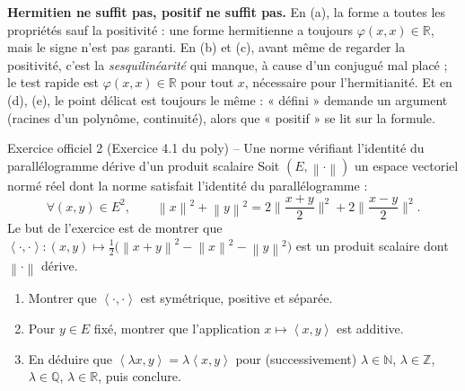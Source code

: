 \documentclass[11pt,a4paper]{article}
\newcommand{\R}{\mathbb{R}}
\newcommand{\N}{\mathbb{N}}
\newcommand{\Z}{\mathbb{Z}}
\newcommand{\Q}{\mathbb{Q}}
\newcommand{\norm}[1]{\left\|#1\right\|}
\newcommand{\ps}[2]{\left\langle #1,#2\right\rangle}
\theoremstyle{definition}
\begin{document}
\begin{piege}
\textbf{Hermitien ne suffit pas, positif ne suffit pas.} En (a), la forme a toutes les propriétés sauf la positivité : une forme hermitienne a toujours $\varphi(x,x)\in\R$, mais le signe n'est pas garanti. En (b) et (c), avant même de regarder la positivité, c'est la \emph{sesquilinéarité} qui manque, à cause d'un conjugué mal placé ; le test rapide est $\varphi(x,x)\in\R$ pour tout $x$, nécessaire pour l'hermitianité. Et en (d), (e), le point délicat est toujours le même : « défini » demande un argument (racines d'un polynôme, continuité), alors que « positif » se lit sur la formule.
\end{piege}

\begin{exo}{Exercice officiel 2 (Exercice 4.1 du poly) -- Une norme vérifiant l'identité du parallélogramme dérive d'un produit scalaire}
Soit $(E,\norm\cdot)$ un espace vectoriel normé réel dont la norme satisfait l'identité du parallélogramme :
\[
\forall(x,y)\in E^2,\qquad\norm x^2+\norm y^2=2\Big\|\frac{x+y}2\Big\|^2+2\Big\|\frac{x-y}2\Big\|^2 .
\]
Le but de l'exercice est de montrer que $\ps\cdot\cdot:(x,y)\mapsto\frac12\big(\norm{x+y}^2-\norm x^2-\norm y^2\big)$ est un produit scalaire dont $\norm\cdot$ dérive.
\begin{enumerate}[label=(\alph*)]
  \item Montrer que $\ps\cdot\cdot$ est symétrique, positive et séparée.
  \item Pour $y\in E$ fixé, montrer que l'application $x\mapsto\ps xy$ est additive.
  \item En déduire que $\ps{\lambda x}y=\lambda\ps xy$ pour (successivement) $\lambda\in\N$, $\lambda\in\Z$, $\lambda\in\Q$, $\lambda\in\R$, puis conclure.
\end{enumerate}
\end{exo}
\end{document}
